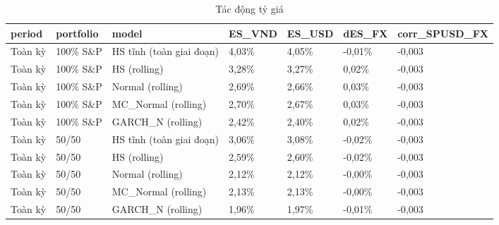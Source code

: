 \begin{table}
\caption{Tác động tỷ giá}
\label{tab:T9_fx_effect}
\begin{tabular}{lllllll}
\toprule
period & portfolio & model & ES\_VND & ES\_USD & dES\_FX & corr\_SPUSD\_FX \\
\midrule
Toàn kỳ & 100\% S\&P & HS tĩnh (toàn giai đoạn) & 4,03\% & 4,05\% & -0,01\% & -0,003 \\
Toàn kỳ & 100\% S\&P & HS (rolling) & 3,28\% & 3,27\% & 0,02\% & -0,003 \\
Toàn kỳ & 100\% S\&P & Normal (rolling) & 2,69\% & 2,66\% & 0,03\% & -0,003 \\
Toàn kỳ & 100\% S\&P & MC\_Normal (rolling) & 2,70\% & 2,67\% & 0,03\% & -0,003 \\
Toàn kỳ & 100\% S\&P & GARCH\_N (rolling) & 2,42\% & 2,40\% & 0,02\% & -0,003 \\
Toàn kỳ & 50/50 & HS tĩnh (toàn giai đoạn) & 3,06\% & 3,08\% & -0,02\% & -0,003 \\
Toàn kỳ & 50/50 & HS (rolling) & 2,59\% & 2,60\% & -0,02\% & -0,003 \\
Toàn kỳ & 50/50 & Normal (rolling) & 2,12\% & 2,12\% & -0,00\% & -0,003 \\
Toàn kỳ & 50/50 & MC\_Normal (rolling) & 2,13\% & 2,13\% & -0,00\% & -0,003 \\
Toàn kỳ & 50/50 & GARCH\_N (rolling) & 1,96\% & 1,97\% & -0,01\% & -0,003 \\
\bottomrule
\end{tabular}
\end{table}
